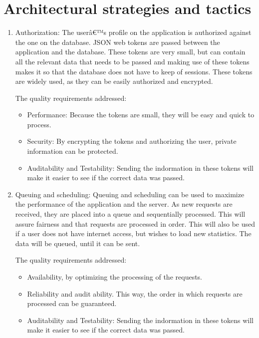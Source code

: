 \documentclass[hidelinks,a4paper,12pt]{article}
\begin{document}
\section{Architectural strategies and tactics}
	\begin{enumerate}
	
		\item Authorization:
		The userâ€™s profile on the application is authorized against the one on the database. JSON web tokens are passed between the application and the database. These tokens are very small, but can contain all the relevant data that needs to be passed and making use of these tokens makes it so that the database does not have to keep of sessions. These tokens are widely used, as they can be easily authorized and encrypted.

		The quality requirements addressed:
		\begin{itemize}
			\item Performance: Because the tokens are small, they will be easy and quick to process.
			\item Security: By encrypting the tokens and authorizing the user, private information can be protected.
			\item Auditability and Testability: Sending the indormation in these tokens will make it easier to see if the correct data was passed.
		\end{itemize}
		
		\item Queuing and scheduling:
		Queuing and scheduling can be used to maximize the performance of the application and the server. As new requests are received, they are placed into a queue and sequentially processed. This will assure fairness and that requests are processed in order. This will also be used if a user does not have internet access, but wishes to load new statistics. The data will be queued, until it can be sent.

		The quality requirements addressed:
		\begin{itemize}
			\item Availability, by optimizing the processing of the requests.
			\item Reliability and audit ability. This way, the order in which requests are processed can be guaranteed.
			\item Auditability and Testability: Sending the indormation in these tokens will make it easier to see if the correct data was passed.
		\end{itemize}
		

\end{enumerate}
\end{document}
